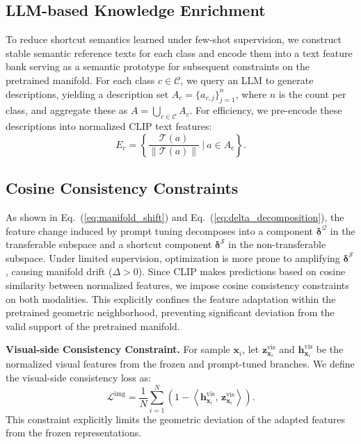\documentclass{article}
\theoremstyle{plain}
\theoremstyle{definition}
\theoremstyle{remark}
\begin{document}
	\subsection{LLM-based Knowledge Enrichment}
	\label{sec:knowledge_enrichment}
	To reduce shortcut semantics learned under few-shot supervision, we construct stable semantic reference texts for each class and encode them into a text feature bank serving as a semantic prototype for subsequent constraints on the pretrained manifold. For each class $c\in \mathcal{C}$, we query an LLM to generate descriptions, yielding a description set $A_c=\{a_{c,j}\}_{j=1}^{n}$, where $n$ is the count per class, and aggregate these as $A=\bigcup_{c\in \mathcal{C}}A_c$. For efficiency, we pre-encode these descriptions into normalized CLIP text features:
	\begin{equation}
		\label{eq:feature_bank}
		E_c=\left\{\frac{\mathcal{T}(a)}{\|\mathcal{T}(a)\|}\ \bigg|\ a\in A_c\right\}.
	\end{equation}
	\vspace{-20pt}
	\subsection{Cosine Consistency Constraints}
	\label{sec:consistency_constraints}
	As shown in Eq.~(\ref{eq:manifold_shift}) and Eq.~(\ref{eq:delta_decomposition}), the feature change induced by prompt tuning decomposes into a component $\boldsymbol{\delta}^{\mathcal{Q}}$ in the transferable subspace and a shortcut component $\boldsymbol{\delta}^{\mathcal{S}}$ in the non-transferable subspace. Under limited supervision, optimization is more prone to amplifying $\boldsymbol{\delta}^{\mathcal{S}}$, causing manifold drift ($\Delta>0$). Since CLIP makes predictions based on cosine similarity between normalized features, we impose cosine consistency constraints on both modalities. This explicitly confines the feature adaptation within the pretrained geometric neighborhood, preventing significant deviation from the valid support of the pretrained manifold.
	
	\textbf{Visual-side Consistency Constraint.}
	For sample $\mathbf{x}_i$, let $\mathbf{z}^{\mathrm{vis}}_{\mathbf{x}_i}$ and $\mathbf{h}^{\mathrm{vis}}_{\mathbf{x}_i}$ be the normalized visual features from the frozen and prompt-tuned branches. We define the visual-side consistency loss as:
	\begin{equation}
		\mathcal{L}^{\mathrm{img}}
		=
		\frac{1}{N}\sum_{i=1}^{N}
		\left(1-\left\langle \mathbf{h}^{\mathrm{vis}}_{\mathbf{x}_i},\, \mathbf{z}^{\mathrm{vis}}_{\mathbf{x}_i}\right\rangle\right).
	\end{equation}
	This constraint explicitly limits the geometric deviation of the adapted features from the frozen representations.
	
\end{document}
